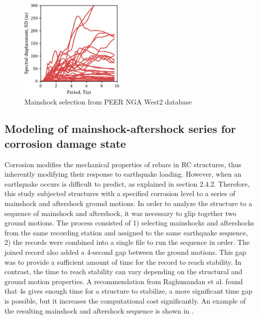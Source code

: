 \begin{figure}[htbp]
	\centering
	\includegraphics[width=0.45\textwidth]{Chapter-5/figs/SD_Spectrum_GM_Selection.pdf}
	\caption{Mainshock selection from PEER NGA West2 database}
	\label{fig:DisplacementSpectrum_Selection}
\end{figure}

\subsection{Modeling of mainshock-aftershock series for corrosion damage state}

Corrosion modifies the mechanical properties of rebars in RC structures, thus inherently modifying their response to earthquake loading. However, when an earthquake occurs is difficult to predict, as explained in section 2.4.2. Therefore, this study subjected structures with a specified corrosion level to a series of mainshock and aftershock ground motions. 
In order to analyze the structure to a sequence of mainshock and aftershock, it was necessary to glip together two ground motions. The process consisted of 1) selecting mainshocks and aftershocks from the same recording station and assigned to the same earthquake sequence, 2) the records were combined into a single file to run the sequence in order. The joined record also added a 4-second gap between the ground motions. This gap was to provide a sufficient amount of time for the record to reach stability. In contrast, the time to reach stability can vary depending on the structural and ground motion properties. A recommendation from Raghunandan et al. \cite{Raghunandan2015} found that 4s gives enough time for a structure to stabilize, a more significant time gap is possible, but it increases the computational cost significantly. An example of the resulting mainshock and aftershock sequence is shown in .

